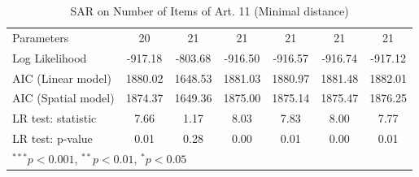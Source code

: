 \begin{table}[!h]
\begin{center}
\begin{tabular}{l c c c c c c }
Parameters              & 20           & 21           & 21           & 21           & 21           & 21           \\
Log Likelihood          & -917.18      & -803.68      & -916.50      & -916.57      & -916.74      & -917.12      \\
AIC (Linear model)      & 1880.02      & 1648.53      & 1881.03      & 1880.97      & 1881.48      & 1882.01      \\
AIC (Spatial model)     & 1874.37      & 1649.36      & 1875.00      & 1875.14      & 1875.47      & 1876.25      \\
LR test: statistic      & 7.66         & 1.17         & 8.03         & 7.83         & 8.00         & 7.77         \\
LR test: p-value        & 0.01         & 0.28         & 0.00         & 0.01         & 0.00         & 0.01         \\
\bottomrule
\multicolumn{7}{l}{\scriptsize{$^{***}p<0.001$, $^{**}p<0.01$, $^*p<0.05$}}
\end{tabular}
\caption{SAR on Number of Items of Art. 11 (Minimal distance)}
\label{table:coefficients}
\end{center}
\end{table}

